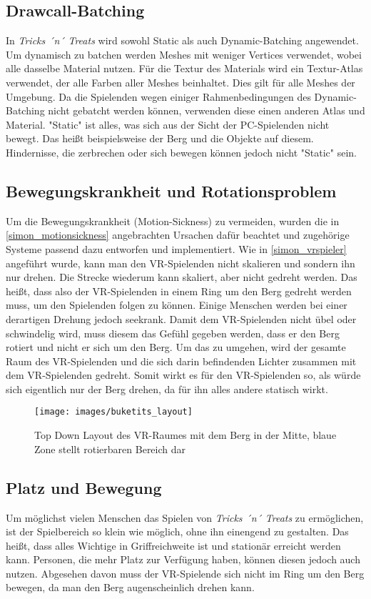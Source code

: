 \subsection{Drawcall-Batching}
In \emph{Tricks ´n´ Treats} wird sowohl Static als auch Dynamic-Batching angewendet. Um dynamisch zu batchen werden Meshes mit weniger Vertices verwendet, wobei alle dasselbe Material nutzen. Für die Textur des Materials wird ein Textur-Atlas verwendet, der alle Farben aller Meshes beinhaltet. Dies gilt für alle Meshes der Umgebung. Da die Spielenden wegen einiger Rahmenbedingungen des Dynamic-Batching nicht gebatcht werden können, verwenden diese einen anderen Atlas und Material. "Static" ist alles, was sich aus der Sicht der PC-Spielenden nicht bewegt. Das heißt beispielsweise der Berg und die Objekte auf diesem. Hindernisse, die zerbrechen oder sich bewegen können jedoch nicht "Static" sein.

\subsection{Bewegungskrankheit und Rotationsproblem}
Um die Bewegungskrankheit (Motion-Sickness) zu vermeiden, wurden die in \ref{simon_motionsickness} angebrachten Ursachen dafür beachtet und zugehörige Systeme passend dazu entworfen und implementiert.
Wie in \ref{simon_vrspieler} angeführt wurde, kann man den VR-Spielenden nicht skalieren und sondern ihn nur drehen. Die Strecke wiederum kann skaliert, aber nicht gedreht werden. Das heißt, dass also der VR-Spielenden in einem Ring um den Berg gedreht werden muss, um den Spielenden folgen zu können. Einige Menschen werden bei einer derartigen Drehung jedoch seekrank. Damit dem VR-Spielenden nicht übel oder schwindelig wird, muss diesem das Gefühl gegeben werden, dass er den Berg rotiert und nicht er sich um den Berg. Um das zu umgehen, wird der gesamte Raum des VR-Spielenden und die sich darin befindenden Lichter zusammen mit dem VR-Spielenden gedreht. Somit wirkt es für den VR-Spielenden so, als würde sich eigentlich nur der Berg drehen, da für ihn alles andere statisch wirkt.

\begin{figure}[h]
	\centering
	\texttt{[image: images/buketits\_layout]}
	\caption{Top Down Layout des VR-Raumes mit dem Berg in der Mitte, blaue Zone stellt rotierbaren Bereich dar}
\end{figure}


\subsection{Platz und Bewegung}
Um möglichst vielen Menschen das Spielen von \emph{Tricks ´n´ Treats} zu ermöglichen, ist der Spielbereich so klein wie möglich, ohne ihn einengend zu gestalten. Das heißt, dass alles Wichtige in Griffreichweite ist und stationär erreicht werden kann. Personen, die mehr Platz zur Verfügung haben, können diesen jedoch auch nutzen. Abgesehen davon muss der VR-Spielende sich nicht im Ring um den Berg bewegen, da man den Berg augenscheinlich drehen kann.

